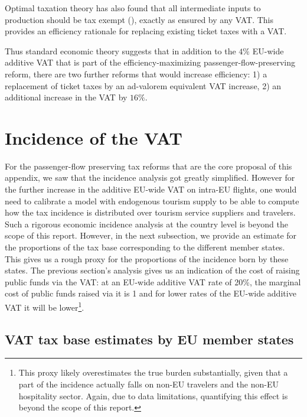 \documentclass[../../main]{subfiles}
\begin{document}
Optimal taxation theory has also found that all intermediate inputs to production should be tax exempt (\citet{diamond1971optimalI}), exactly as ensured by any VAT. This provides an efficiency rationale for replacing existing ticket taxes with a VAT. 

Thus standard economic theory suggests that in addition to the $4\%$ EU-wide additive VAT that is part of the efficiency-maximizing passenger-flow-preserving reform, there are two further reforms that would increase efficiency: 1) a replacement of ticket taxes by an ad-valorem equivalent VAT increase, 2) an additional increase in the VAT by $16\%$. 

\section{Incidence of the VAT}

For the passenger-flow preserving tax reforms that are the core proposal of this appendix, we saw that the incidence analysis got greatly simplified. However for the further increase in the additive EU-wide VAT on intra-EU flights, one would need to calibrate a model with endogenous tourism supply to be able to compute how the tax incidence is distributed over tourism service suppliers and travelers. Such a rigorous economic incidence analysis at the country level is beyond the scope of this report. %
However, in the next subsection, we provide an estimate for the proportions of the tax base corresponding to the different member states. This gives us a rough proxy for the proportions of the incidence born by these states. The previous section's analysis gives us an indication of the cost of raising public funds via the VAT: at an EU-wide additive VAT rate of 20\%, the marginal cost of public funds raised via it is 1 and for lower rates of the EU-wide additive VAT it will be lower\footnote{This proxy likely overestimates the true burden substantially, given that a part of the incidence actually falls on non-EU travelers and the non-EU hospitality sector. Again, due to data limitations, quantifying this effect is beyond the scope of this report.}. 


\subsection{VAT tax base estimates by EU member states}
\end{document}
